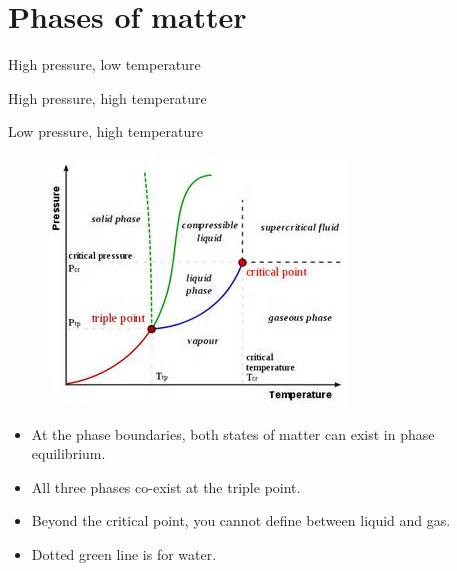 \documentclass[a4paper, 11pt, normalem]{report}
\begin{document}
\section{Phases of matter}
\begin{description}[align=right,labelwidth=4cm]
    \item[Solid] High pressure, low temperature
    \item[Liquid] High pressure, high temperature
    \item[Vapour/gas] Low pressure, high temperature
\end{description}
\begin{figure}[H]
    \centering
    \includegraphics{MatterPhases.jpg}
\end{figure}
\begin{itemize}
    \item At the phase boundaries, both states of matter can exist in phase equilibrium.
    \item All three phases co-exist at the triple point.
    \item Beyond the critical point, you cannot define between liquid and gas.
    \item Dotted green line is for water.
\end{itemize}
\end{document}
